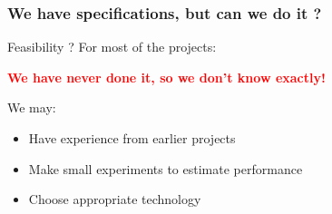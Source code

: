\documentclass[compress]{beamer}
\begin{document}
\begin{frame}
\frametitle{We have specifications, but can we do it ?}
\begin{block}{Feasibility ?}
	For most of the projects:
	\begin{center}
		\textcolor{red}{\textbf{We have never done it, so we don’t know exactly!}}
	\end{center}
	We may:
	\begin{itemize}
		\item Have experience from earlier projects
		\item Make small experiments to estimate performance
		\item Choose appropriate technology
	\end{itemize}
\end{block}
	
\end{frame}

\end{document}
